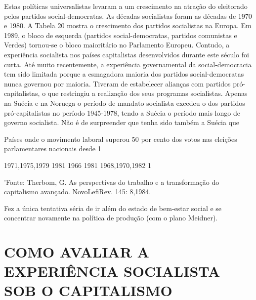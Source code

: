 \documentclass[twocolumn,amsmath,amssymb,aps,pre,floatfix]{revtex4-2}
\begin{document}
Estas políticas universalistas levaram a um crescimento na atração do eleitorado pelos partidos social-democratas. As décadas socialistas foram as décadas de 1970 e 1980. A Tabela 20 mostra o crescimento dos partidos socialistas na Europa. Em 1989, o bloco de esquerda (partidos social-democratas, partidos comunistas e Verdes) tornou-se o bloco maioritário no Parlamento Europeu. Contudo, a experiência socialista nos países capitalistas desenvolvidos durante este século foi curta. Até muito recentemente, a experiência governamental da social-democracia tem sido limitada porque a esmagadora maioria dos partidos social-democratas nunca governou por maioria. Tiveram de estabelecer alianças com partidos pró-capitalistas, o que restringiu a realização dos seus programas socialistas. Apenas na Suécia e na Noruega o período de mandato socialista excedeu o dos partidos pró-capitalistas no período 1945-1978, tendo a Suécia o período mais longo de governo socialista. Não é de surpreender que tenha sido também a Suécia que
\par
Países onde o movimento laboral superou 50 por cento dos votos nas eleições parlamentares nacionais desde 1%
\par
1971,1975,1979 1981 1966 1981 1968,1970,1982 1%
\par
'Fonte: Therbom, G. As perspectivas do trabalho e a transformação do capitalismo avançado. NovoLefiRev. 145: 8,1984.
\par
Fez a única tentativa séria de ir além do estado de bem-estar social e se concentrar novamente na política de produção (com o plano Meidner).
\par

\section{COMO AVALIAR A EXPERIÊNCIA SOCIALISTA SOB O CAPITALISMO}
\end{document}
